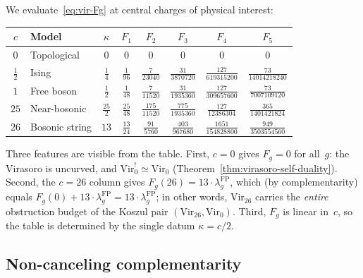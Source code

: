 \begin{computation}\label{comp:vir-physical-cc}
We evaluate~\eqref{eq:vir-Fg} at central charges of physical interest:

\medskip
\begin{center}
\renewcommand{\arraystretch}{1.3}
{\footnotesize
\begin{tabular}{clcccccc}
\toprule
$c$ & Model & $\kappa$ & $F_1$ & $F_2$ & $F_3$ & $F_4$ & $F_5$ \\
\midrule
$0$ & Topological & $0$ & $0$ & $0$ & $0$ & $0$ & $0$ \\[3pt]
$\frac{1}{2}$ & Ising & $\frac{1}{4}$ & $\frac{1}{96}$ & $\frac{7}{23040}$ & $\frac{31}{3870720}$ & $\frac{127}{619315200}$ & $\frac{73}{14014218240}$ \\[6pt]
$1$ & Free boson & $\frac{1}{2}$ & $\frac{1}{48}$ & $\frac{7}{11520}$ & $\frac{31}{1935360}$ & $\frac{127}{309657600}$ & $\frac{73}{7007109120}$ \\[6pt]
$25$ & Near-bosonic & $\frac{25}{2}$ & $\frac{25}{48}$ & $\frac{175}{11520}$ & $\frac{775}{1935360}$ & $\frac{127}{12386304}$ & $\frac{365}{1401421824}$ \\[6pt]
$26$ & Bosonic string & $13$ & $\frac{13}{24}$ & $\frac{91}{5760}$ & $\frac{403}{967680}$ & $\frac{1651}{154828800}$ & $\frac{949}{3503554560}$ \\[3pt]
\bottomrule
\end{tabular}
}
\end{center}

\medskip
\noindent
Three features are visible from the table.  First, $c = 0$ gives $F_g = 0$ for all~$g$: the Virasoro is uncurved, and $\mathrm{Vir}_0^! \simeq \mathrm{Vir}_0$ (Theorem~\ref{thm:virasoro-self-duality}).  Second, the $c = 26$ column gives $F_g(26) = 13 \cdot \lambda_g^{\mathrm{FP}}$, which (by complementarity) equals $F_g(0) + 13 \cdot \lambda_g^{\mathrm{FP}} = 13 \cdot \lambda_g^{\mathrm{FP}}$; in other words, $\mathrm{Vir}_{26}$ carries the \emph{entire} obstruction budget of the Koszul pair $(\mathrm{Vir}_{26}, \mathrm{Vir}_0)$.  Third, $F_g$ is linear in~$c$, so the table is determined by the single datum $\kappa = c/2$.
\end{computation}

\subsection{Non-canceling complementarity}\label{subsec:vir-complementarity}

